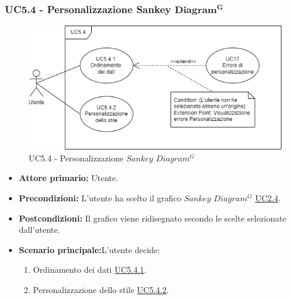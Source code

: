 \subsubsection{UC5.4 - Personalizzazione Sankey ${\mathbf{Diagram^{G}}}$}
\label{sec:UC5.4}
\begin{figure}[h!]
	\centering
	\includegraphics[scale=0.60]{../../assets/personalizzazioneSankey.png}
	\caption{UC5.4 - Personalizzazione $Sankey$ $Diagram^{G}$}
\end{figure}
\begin{itemize}
    \item \textbf{Attore primario:} Utente.
	\item \textbf{Precondizioni:} L'utente ha scelto il grafico $Sankey$ $Diagram^{G}$ \hyperref[sec:UC2.4]{UC2.4}.
	\item \textbf{Postcondizioni:} Il grafico viene ridisegnato secondo le scelte selezionate dall'utente.
	\item \textbf{Scenario principale:}L'utente decide:
	\begin{enumerate}
        \item Ordinamento dei dati \hyperref[sec:UC5.4.1]{UC5.4.1}.
        \item Personalizzazione dello stile \hyperref[sec:UC5.4.2]{UC5.4.2}.
    \end{enumerate}
\end{itemize}
